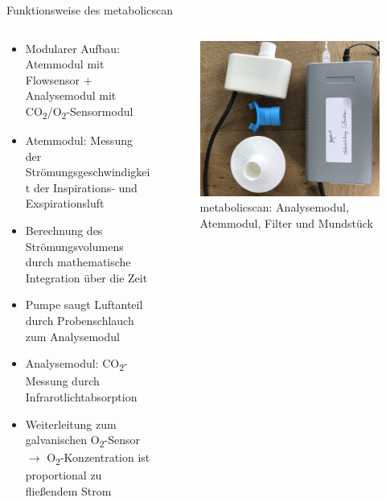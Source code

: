 \documentclass[colorBG,slideColor,8pt]{beamer}
\begin{document}
\begin{frame}{Funktionsweise des metabolicscan}
\begin{columns}
\begin{column}{0.5\linewidth}
\begin{itemize}
	\item Modularer Aufbau: Atemmodul mit Flowsensor + Analysemodul mit CO\textsubscript{2}/O\textsubscript{2}-Sensormodul
	\item Atemmodul: Messung der Strömungsgeschwindigkeit der Inspirations- und Exspirationsluft
	\item Berechnung des Strömungsvolumens durch mathematische Integration über die Zeit
	\item Pumpe saugt Luftanteil durch Probenschlauch zum Analysemodul
	\item Analysemodul: CO\textsubscript{2}-Messung durch Infrarotlichtabsorption
	\item Weiterleitung zum galvanischen O\textsubscript{2}-Sensor $\rightarrow$ O\textsubscript{2}-Konzentration ist proportional zu fließendem Strom
\end{itemize}
\end{column}
\begin{column}{0.5\linewidth}
			\begin{figure}[H]
				\centering
				\includegraphics[width=0.8\linewidth]{Bilder/mbs.jpg}
				\caption{metabolicscan: Analysemodul, Atemmodul, Filter und Mundstück}
			\end{figure}
\end{column}
\end{columns}
\end{frame}
\end{document}
